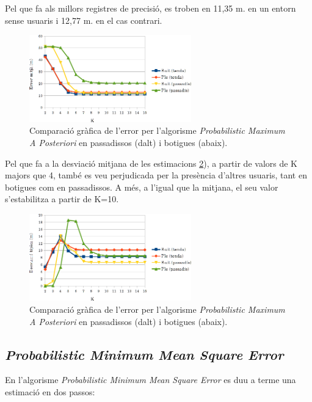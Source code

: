 Pel que fa als millors registres de precisió, es troben en 11,35 m. en un entorn sense usuaris i 12,77 m. en el cas contrari.

\begin{figure}[ht]
\begin{center}
\includegraphics[width=7cm]{imatges/map_mitja.png}
\caption{Comparació gràfica de l'error per l'algorisme \textit{Probabilistic Maximum A Posteriori} en passadissos (dalt) i botigues (abaix).}
\label{fig:grafic_mitja_MAP}
\end{center}
\end{figure}

Pel que fa a la desviació mitjana de les estimacions \ref{fig:grafic_desviacio_MAP}), a partir de valors de K majors que 4, també es veu perjudicada per la presència d'altres usuaris, tant en botigues com en passadissos. A més, a l'igual que la mitjana, el seu valor s'estabilitza a partir de K=10.

\begin{figure}[ht]
\begin{center}
\includegraphics[width=7cm]{imatges/map_desviacio.png}
\caption{Comparació gràfica de l'error per l'algorisme \textit{Probabilistic Maximum A Posteriori} en passadissos (dalt) i botigues (abaix).}
\label{fig:grafic_desviacio_MAP}
\end{center}
\end{figure}

\subsection{\textit{Probabilistic Minimum Mean Square Error}}

En l'algorisme \textit{Probabilistic Minimum Mean Square Error} es duu a terme una estimació en dos passos:

